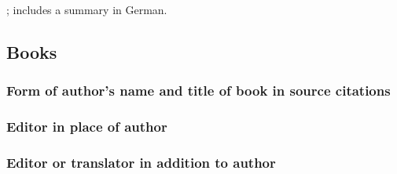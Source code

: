 \documentclass[11pt,letterpaper,oneside]{article}
\begin{document}
\begin{citebib}
\item \cite{wereszycki1977}; includes a summary in German.
\item \cite[272]{kern1938}
\item \cite{pirumova1977b}
\item \cite{furet1999}
\end{citebib}

\setcounter{subsection}{4}
\subsection{Books}
\setcounter{subsection}{14}

\setcounter{subsubsection}{100}
\subsubsection{Form of author's name and title of book in source citations}

\begin{citebib}
\item \cite[79--80]{gawande2014}
\item \cite[191]{gawande2014}
\end{citebib}

\setcounter{subsubsection}{102}
\subsubsection{Editor in place of author}
\label{14.103}

\begin{citebib}
\item \cite[100]{egan2014}
\item \cite[33]{schechter2011}
\item \cite[34]{silverstein1974}
\item \cite[301--2]{egan2014}
\item \cite[54--56]{schechter2011}
\item \cite[38]{silverstein1974}
\end{citebib}

\subsubsection{Editor or translator in addition to author}
\label{14.104}
\end{document}
